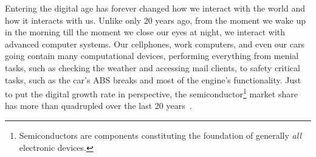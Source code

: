%
%
%

Entering the digital age has forever changed how we interact with the world and how it interacts with us.
Unlike only 20 years ago, from the moment we wake up in the morning till the moment we close our eyes at night, we interact with advanced computer systems.
Our cellphones, work computers, and even our cars going contain many computational devices, performing everything from menial tasks, such as checking the weather and accessing mail clients, to safety critical tasks, such as the car's ABS breaks and most of the engine's functionality.
Just to put the digital growth rate in perspective, the semiconductor\footnote{Semiconductors are components constituting the foundation of generally \emph{all} electronic devices.} market share has more than quadrupled over the last 20 years~\cite{statista:2022}.

